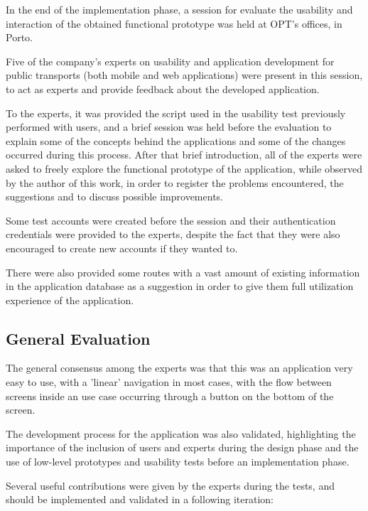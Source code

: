 In the end of the implementation phase, a session for evaluate the usability and interaction of the obtained functional prototype was held at OPT's offices, in Porto. 

Five of the company's experts on usability and application development for public transports (both mobile and web applications) were present in this session, to act as experts and provide feedback about the developed application.


To the experts, it was provided the script used in the usability test previously performed with users, and a brief session was held before the evaluation to explain some of the concepts behind the applications and some of the changes occurred during this process.
After that brief introduction, all of the experts were asked to freely explore the functional prototype of the application, while observed by the author of this work, in order to register the problems encountered, the suggestions and to discuss possible improvements.

Some test accounts were created before the session and their authentication credentials were provided to the experts, despite the fact that they were also encouraged to create new accounts if they wanted to.

There were also provided some routes with a vast amount of existing information in the application database as a suggestion in order to give them full utilization experience of the application.

\subsection{General Evaluation}

The general consensus among the experts was that this was an application very easy to use, with a 'linear' navigation in most cases, with the flow between screens inside an use case occurring through a button on the bottom of the screen.

The development process for the application was also validated, highlighting the importance of the inclusion of users and experts during the design phase and the use of low-level prototypes and usability tests before an implementation phase.

Several useful contributions were given by the experts during the tests, and should be implemented and validated in a following iteration:

